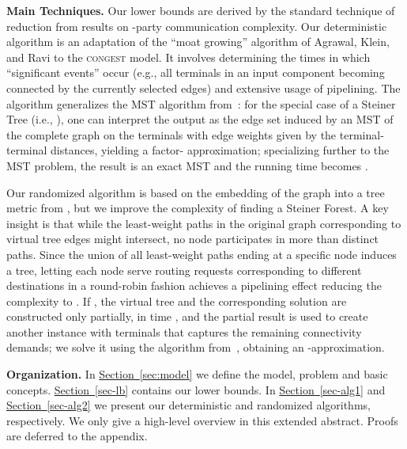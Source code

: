 \documentclass[letterpaper,11pt]{article}
\newcommand{\namedref}[2]{\hyperref[#2]{#1~\ref*{#2}}}
\newcommand{\sectionref}[1]{\namedref{Section}{#1}}
\newcommand{\Congest}{\textsc{congest}\xspace}
\renewcommand{\paragraph}[1]{\smallskip\par\noindent\textbf{#1}}
\begin{document}
\paragraph{Main Techniques.}
Our lower
bounds are
derived by the standard technique of reduction from results on -party
communication complexity.
Our deterministic algorithm is an adaptation of the ``moat growing'' algorithm
of Agrawal, Klein, and Ravi \cite{AgrawalKR-95} to the \Congest model. It
involves determining the times in which ``significant events'' occur (e.g., all
terminals in an input component becoming connected by the currently selected
edges)
and extensive usage of pipelining. The algorithm generalizes
the MST algorithm from~\cite{KuttenP-98}: for the special case of a Steiner Tree (i.e.,
), one can interpret the output as the edge set induced by an MST of the
complete graph on the terminals with edge weights given by the terminal-terminal
distances, yielding a factor- approximation; specializing further to the MST
problem, the result is an exact MST and the running time becomes
.



Our randomized algorithm is based on the embedding of the graph into a tree
metric from \cite{KKMPT-12}, but we improve the complexity of finding a Steiner
Forest. A key insight is that while the least-weight paths in the original
graph corresponding to virtual tree edges might intersect, no node participates
in more than  distinct paths. Since the union of
all least-weight paths ending at a specific node induces a tree, letting each
node serve routing requests corresponding to different destinations in a
round-robin fashion achieves a pipelining effect reducing the complexity to
.  If , the virtual tree and the corresponding
solution are constructed only partially, in time ,
and the partial result is used to create another instance with
 terminals that captures the remaining connectivity demands; we solve it using
the algorithm from~\cite{LenzenP13}, obtaining an -approximation.






\paragraph{Organization.}
In \sectionref{sec:model} we define the model, problem and basic
concepts.  \sectionref{sec-lb} contains our lower bounds.  
In \sectionref{sec-alg1} and \sectionref{sec-alg2} we  present our
deterministic and randomized algorithms, respectively. We only give a high-level overview in this extended abstract. Proofs
are deferred to the appendix.
\end{document}
